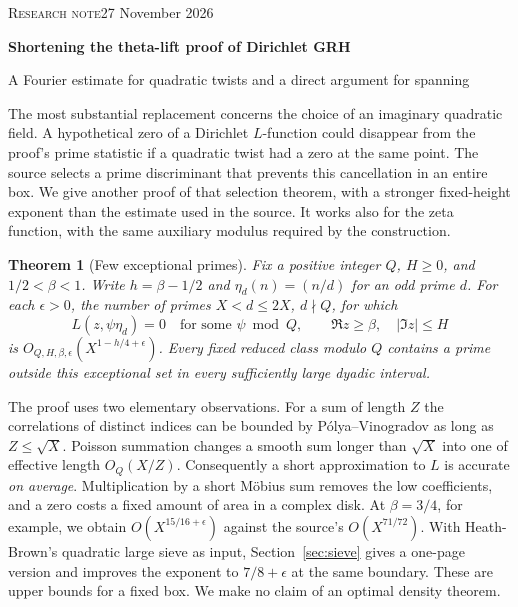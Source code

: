 \documentclass[11pt]{article}
\newtheorem{thm}{Theorem}\newtheorem{lem}[thm]{Lemma}
\begin{document}
\thispagestyle{empty}
{\small\color{ink}\textsc{Research note}\hfill 27 November 2026}

\vspace{0.16in}
{\LARGE\bfseries Shortening the theta-lift proof of Dirichlet GRH\par}
\vspace{0.05in}
{\large A Fourier estimate for quadratic twists and a direct argument for spanning\par}
\vspace{0.09in}
The most substantial replacement concerns the choice of an imaginary quadratic field. A hypothetical zero of a Dirichlet $L$-function could disappear from the proof's prime statistic if a quadratic twist had a zero at the same point. The source selects a prime discriminant that prevents this cancellation in an entire box. We give another proof of that selection theorem, with a stronger fixed-height exponent than the estimate used in the source. It works also for the zeta function, with the same auxiliary modulus required by the construction.

\begin{thm}[Few exceptional primes]\label{thm:tw}
Fix a positive integer $Q$, $H\ge0$, and $1/2<\beta<1$. Write $h=\beta-1/2$ and $\eta_d(n)=(n/d)$ for an odd prime $d$. For each $\epsilon>0$, the number of primes $X<d\le2X$, $d\nmid Q$, for which
\[
 L(z,\psi\eta_d)=0\quad\text{for some }\psi\bmod Q,
 \qquad \Re z\ge\beta,\quad |\Im z|\le H
\]
is $O_{Q,H,\beta,\epsilon}(X^{1-h/4+\epsilon})$. Every fixed reduced class modulo $Q$ contains a prime outside this exceptional set in every sufficiently large dyadic interval.
\end{thm}

The proof uses two elementary observations. For a sum of length $Z$ the correlations of distinct indices can be bounded by P\'olya--Vinogradov as long as $Z\le\sqrt X$. Poisson summation changes a smooth sum longer than $\sqrt X$ into one of effective length $O_Q(X/Z)$. Consequently a short approximation to $L$ is accurate \emph{on average}. Multiplication by a short M\"obius sum removes the low coefficients, and a zero costs a fixed amount of area in a complex disk. At $\beta=3/4$, for example, we obtain $O(X^{15/16+\epsilon})$ against the source's $O(X^{71/72})$. With Heath-Brown's quadratic large sieve as input, Section~\ref{sec:sieve} gives a one-page version and improves the exponent to $7/8+\epsilon$ at the same boundary. These are upper bounds for a fixed box. We make no claim of an optimal density theorem.
\end{document}
